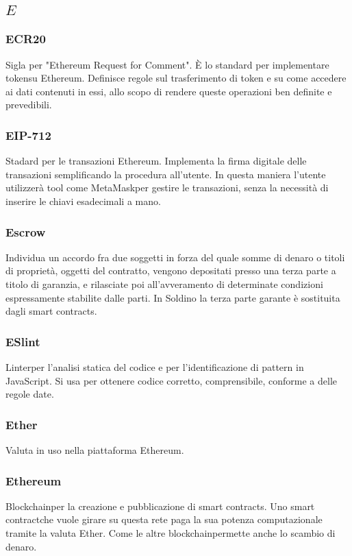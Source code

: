 \subsection*{\quad$E\quad$}
\subsubsection*{ECR20}
Sigla per "Ethereum Request for Comment". È lo standard per implementare token\glosp su Ethereum. Definisce regole sul trasferimento di token e su come accedere ai dati contenuti in essi, allo scopo di rendere queste operazioni ben definite e prevedibili.

\subsubsection*{EIP-712}
Stadard per le transazioni Ethereum. Implementa la firma digitale delle transazioni semplificando la procedura all'utente. In questa maniera l'utente utilizzerà tool come MetaMask\glosp per gestire le transazioni, senza la necessità di inserire le chiavi esadecimali a mano.

\subsubsection*{Escrow}
Individua un accordo fra due soggetti in forza del quale somme di denaro o titoli di proprietà, oggetti del contratto, vengono depositati presso una terza parte a titolo di garanzia, e rilasciate poi all'avveramento di determinate condizioni espressamente stabilite dalle parti. In Soldino la terza parte garante è sostituita dagli smart contracts\glo.

\subsubsection*{ESlint}
Linter\glo per l'analisi statica del codice e per l'identificazione di pattern in JavaScript. Si usa per ottenere codice corretto, comprensibile, conforme a delle regole date.

\subsubsection*{Ether}
Valuta in uso nella piattaforma Ethereum\glo.

\subsubsection*{Ethereum}
Blockchain\glosp per la creazione e pubblicazione di smart contracts\glo. Uno smart contract\glosp che vuole girare su questa rete paga la sua potenza computazionale tramite la valuta Ether. Come le altre blockchain\glosp permette anche lo scambio di denaro.

